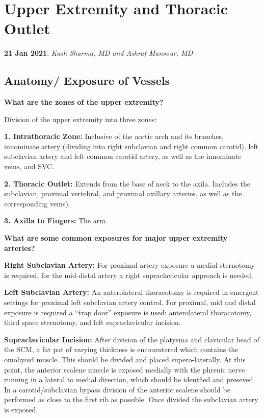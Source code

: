 \documentclass[
]{book}
\begin{document}
\hypertarget{upper-extremity-and-thoracic-outlet}{%
\chapter{Upper Extremity and Thoracic Outlet}\label{upper-extremity-and-thoracic-outlet}}

\textbf{21 Jan 2021}: \emph{Kush Sharma, MD and Ashraf Mansour, MD}

\hypertarget{anatomy-exposure-of-vessels}{%
\section{Anatomy/ Exposure of Vessels}\label{anatomy-exposure-of-vessels}}

\textbf{What are the zones of the upper extremity?}
\citep{illig57UpperExtremity2019, illig57UpperExtremity2019}

Division of the upper extremity into three zones:

\textbf{1. Intrathoracic Zone:} Inclusive of the aortic arch and its
branches, innominate artery (dividing into right subclavian and right
common carotid), left subclavian artery and left common carotid artery,
as well as the innominate veins, and SVC.

\textbf{2. Thoracic Outlet:} Extends from the base of neck to the axila.
Includes the subclavian, proximal vertebral, and proximal axillary
arteries, as well as the corresponding veins).

\textbf{3. Axilla to Fingers:} The arm.

\textbf{What are some common exposures for major upper extremity arteries?}

\textbf{Right Subclavian Artery:} For proximal artery exposure a medial
sternotomy is required, for the mid-distal artery a right
supraclavicular approach is needed.

\textbf{Left Subclavian Artery:} An anterolateral thoracotomy is required in
emergent settings for proximal left subclavian artery control. For
proximal, mid and distal exposure is required a ``trap door'' exposure is
used: anterolateral thoracotomy, third space sternotomy, and left
supraclavicular incision.

\textbf{Supraclavicular Incision:} After division of the platysma and
clavicular head of the SCM, a fat pat of varying thickness is
encourntered which contains the omohyoid muscle. This should be divided
and placed supero-laterally. At this point, the anterior scalene muscle
is exposed medially with the phrenic nerve running in a lateral to
medial direction, which should be identfied and preseved. In a
carotid/subclavian bypass division of the anterior scalene should be
performed as close to the first rib as possible. Once divided the
subclavian artery is exposed.
\end{document}
